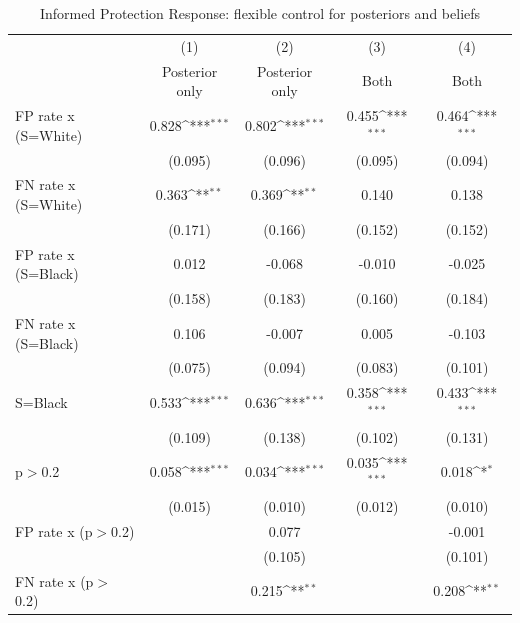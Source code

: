 \begin{table}[htbp]\centering
\def\sym#1{\ifmmode^{#1}\else\(^{#1}\)\fi}
\caption{Informed Protection Response: flexible control for posteriors and beliefs}
\begin{tabular}{l*{4}{c}}
\hline\hline
                &\multicolumn{1}{c}{(1)}&\multicolumn{1}{c}{(2)}&\multicolumn{1}{c}{(3)}&\multicolumn{1}{c}{(4)}\\
                &\multicolumn{1}{c}{Posterior only}&\multicolumn{1}{c}{Posterior only}&\multicolumn{1}{c}{Both}&\multicolumn{1}{c}{Both}\\
\hline
FP rate x (S=White)&    0.828\sym{***}&    0.802\sym{***}&    0.455\sym{***}&    0.464\sym{***}\\
                &  (0.095)         &  (0.096)         &  (0.095)         &  (0.094)         \\
FN rate x (S=White)&    0.363\sym{**} &    0.369\sym{**} &    0.140         &    0.138         \\
                &  (0.171)         &  (0.166)         &  (0.152)         &  (0.152)         \\
FP rate x (S=Black)&    0.012         &   -0.068         &   -0.010         &   -0.025         \\
                &  (0.158)         &  (0.183)         &  (0.160)         &  (0.184)         \\
FN rate x (S=Black)&    0.106         &   -0.007         &    0.005         &   -0.103         \\
                &  (0.075)         &  (0.094)         &  (0.083)         &  (0.101)         \\
S=Black         &    0.533\sym{***}&    0.636\sym{***}&    0.358\sym{***}&    0.433\sym{***}\\
                &  (0.109)         &  (0.138)         &  (0.102)         &  (0.131)         \\
p$>$0.2         &    0.058\sym{***}&    0.034\sym{***}&    0.035\sym{***}&    0.018\sym{*}  \\
                &  (0.015)         &  (0.010)         &  (0.012)         &  (0.010)         \\
FP rate x (p$>$0.2)&                  &    0.077         &                  &   -0.001         \\
                &                  &  (0.105)         &                  &  (0.101)         \\
FN rate x (p$>$0.2)&                  &    0.215\sym{**} &                  &    0.208\sym{**} \\

\end{tabular}
\end{table}
